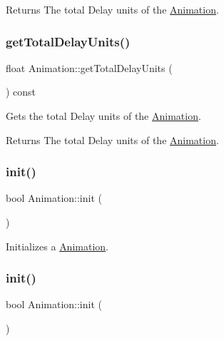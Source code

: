 \begin{DoxyReturn}{Returns}
The total Delay units of the \hyperlink{classAnimation}{Animation}. 
\end{DoxyReturn}
\mbox{\label{classAnimation_aa40cf40bf964a9acb74573e385a23f2f}} 
\subsubsection{\texorpdfstring{get\+Total\+Delay\+Units()}{getTotalDelayUnits()}\hspace{0.1cm}{\footnotesize\ttfamily [2/2]}}
{\footnotesize\ttfamily float Animation\+::get\+Total\+Delay\+Units (\begin{DoxyParamCaption}{ }\end{DoxyParamCaption}) const\hspace{0.3cm}{\ttfamily [inline]}}

Gets the total Delay units of the \hyperlink{classAnimation}{Animation}.

\begin{DoxyReturn}{Returns}
The total Delay units of the \hyperlink{classAnimation}{Animation}. 
\end{DoxyReturn}
\mbox{\label{classAnimation_a8b88933b9e5de3ba1fd3dceee9391192}} 
\subsubsection{\texorpdfstring{init()}{init()}\hspace{0.1cm}{\footnotesize\ttfamily [1/2]}}
{\footnotesize\ttfamily bool Animation\+::init (\begin{DoxyParamCaption}{ }\end{DoxyParamCaption})}

Initializes a \hyperlink{classAnimation}{Animation}. \mbox{\label{classAnimation_a8b88933b9e5de3ba1fd3dceee9391192}} 
\subsubsection{\texorpdfstring{init()}{init()}\hspace{0.1cm}{\footnotesize\ttfamily [2/2]}}
{\footnotesize\ttfamily bool Animation\+::init (\begin{DoxyParamCaption}{ }\end{DoxyParamCaption})}

